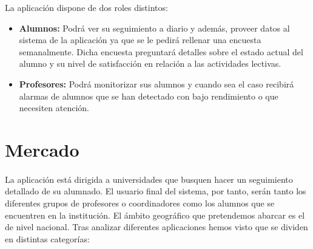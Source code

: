 La aplicación dispone de dos roles distintos:
\begin{itemize}
\item \textbf{Alumnos:} Podrá ver su seguimiento a diario y además, proveer datos al sistema de la aplicación ya que se le pedirá rellenar una encuesta semanalmente. Dicha encuesta preguntará detalles sobre el estado actual del alumno y su nivel de satisfacción en relación a las actividades lectivas.  

\item \textbf{Profesores:} Podrá monitorizar sus alumnos y cuando sea el caso recibirá alarmas de alumnos que se han detectado con bajo rendimiento o que necesiten atención.
\end{itemize}

\section{Mercado}

\paragraph{}
La aplicación está dirigida a universidades que busquen hacer un seguimiento detallado de su alumnado. El usuario final del sistema, por tanto, serán tanto los diferentes grupos de profesores o coordinadores como los alumnos que se encuentren en la institución. El ámbito geográfico que pretendemos abarcar es el de nivel nacional. Tras analizar diferentes aplicaciones hemos visto que se dividen en distintas categorías:

